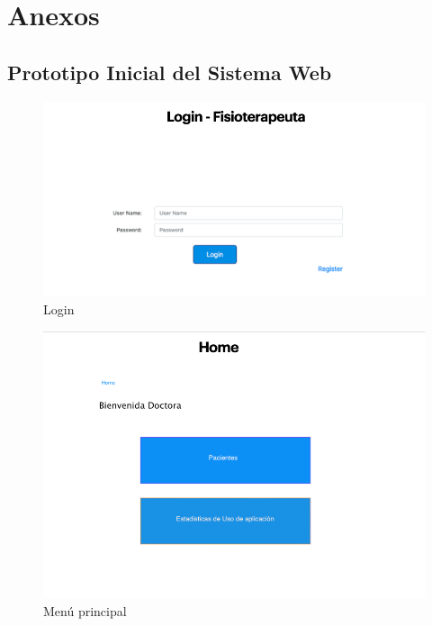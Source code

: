 \documentclass[12pt]{article}
\begin{document}



\section{Anexos}
\subsection{Prototipo Inicial del Sistema Web} 


\begin{figure}[ht]
\centering
\includegraphics[scale=0.4]{imag/P1.png}
\caption{Login }
\label{6}
\end{figure}
\FloatBarrier

\begin{figure}[ht]
\centering
\includegraphics[scale=0.4]{imag/P3.png}
\caption{Menú principal }
\label{6}
\end{figure}
\FloatBarrier
\end{document}
